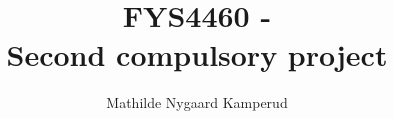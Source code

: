 \documentclass[a4paper, english,10pt]{article}
\begin{document}
\title{FYS4460 - \\  Second compulsory project}
\author{Mathilde Nygaard Kamperud}
\maketitle


\end{document}
